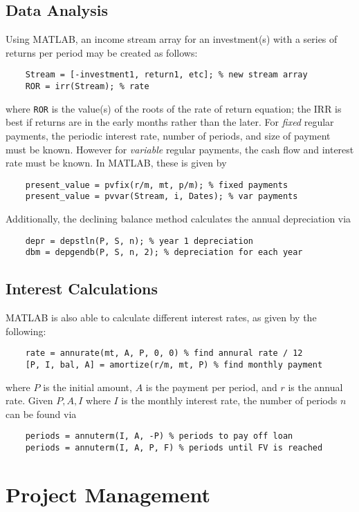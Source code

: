 \documentclass[oneside, 11pt]{book}
\begin{document}
\section{Data Analysis}
Using MATLAB, an income stream array for an investment(s) with a series of returns per period may be created as follows:
\begin{verbatim}
    Stream = [-investment1, return1, etc]; % new stream array
    ROR = irr(Stream); % rate
\end{verbatim}
where \texttt{ROR} is the value(s) of the roots of the rate of return equation; the IRR is best if returns are in the early months rather than the later. For \emph{fixed} regular payments, the periodic interest rate, number of periods, and size of payment must be known. However for \emph{variable} regular payments, the cash flow and interest rate must be known. In MATLAB, these is given by
\begin{verbatim}
    present_value = pvfix(r/m, mt, p/m); % fixed payments
    present_value = pvvar(Stream, i, Dates); % var payments
\end{verbatim}
Additionally, the declining balance method calculates the annual depreciation via
\begin{verbatim}
    depr = depstln(P, S, n); % year 1 depreciation
    dbm = depgendb(P, S, n, 2); % depreciation for each year
\end{verbatim}

\section{Interest Calculations}
MATLAB is also able to calculate different interest rates, as given by the following:
\begin{verbatim}
    rate = annurate(mt, A, P, 0, 0) % find annural rate / 12
    [P, I, bal, A] = amortize(r/m, mt, P) % find monthly payment
\end{verbatim}
where $P$ is the initial amount, $A$ is the payment per period, and $r$ is the annual rate. Given $P, A, I$ where $I$ is the monthly interest rate, the number of periods $n$ can be found via
\begin{verbatim}
    periods = annuterm(I, A, -P) % periods to pay off loan
    periods = annuterm(I, A, P, F) % periods until FV is reached
\end{verbatim}

\chapter{Project Management}
\end{document}
